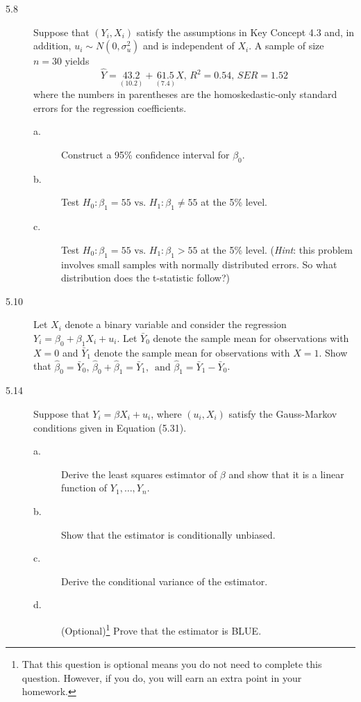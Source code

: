 \documentclass[a4paper,11pt]{article}
\begin{document}
\vspace{0.2cm}

\begin{description}
\item[{5.8}] Suppose that \((Y_i, X_i)\) satisfy the assumptions in Key
Concept 4.3 and, in addition, \(u_i \sim N(0, \sigma^2_u)\) and
is independent of \(X_i\). A sample of size \(n=30\) yields
\begin{equation*}
\hat{Y} = \underset{\displaystyle (10.2)}{43.2} + \underset{\displaystyle (7.4)}{61.5}X,\, R^2 = 0.54,\, SER = 1.52
\end{equation*}
where the numbers in parentheses are the homoskedastic-only
standard errors for the regression coefficients.
\begin{description}
\item[{a.}] Construct a 95\% confidence interval for \(\beta_0\).
\item[{b.}] Test \(H_0: \beta_1 = 55 \text{ vs. } H_1: \beta_1 \neq 55\)
at the 5\% level.
\item[{c.}] Test \(H_0: \beta_1 = 55 \text{ vs. } H_1: \beta_1 > 55\) at
the 5\% level.
(\emph{Hint}: this problem involves small samples with normally
distributed errors. So what distribution does the t-statistic
follow?)
\end{description}
\end{description}

\vspace{0.2cm}

\begin{description}
\item[{5.10}] Let \(X_i\) denote a binary variable and consider the
regression \(Y_i = \beta_0 + \beta_1 X_i + u_i\). Let
\(\bar{Y}_0\) denote the sample mean for observations with
\(X=0\) and \(\bar{Y}_1\) denote the sample mean for
observations with \(X=1\). Show that \(\hat{\beta}_0 =
          \bar{Y}_0,\, \hat{\beta}_0 + \hat{\beta}_1 = \bar{Y}_1,\,
          \text{ and } \hat{\beta}_1 = \bar{Y}_1 - \bar{Y}_0\).
\end{description}

\vspace{0.2cm}

\begin{description}
\item[{5.14}] Suppose that \(Y_i = \beta X_i + u_i\), where \((u_i, X_i)\)
satisfy the Gauss-Markov conditions given in Equation
(5.31).
\begin{description}
\item[{a.}] Derive the least squares estimator of \(\beta\) and show that
it is a linear function of \(Y_1, \ldots, Y_n\).
\item[{b.}] Show that the estimator is conditionally unbiased.
\item[{c.}] Derive the conditional variance of the estimator.
\item[{d.}] (Optional)\footnote{That this question is optional means you do not need to complete this
question. However, if you do, you will earn an extra point in your
homework.} Prove that the estimator is BLUE.
\end{description}
\end{description}
\end{document}
